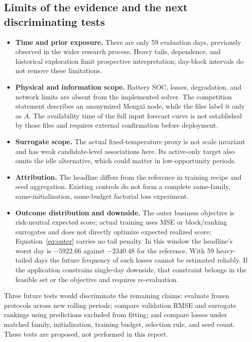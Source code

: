 \documentclass[11pt,a4paper]{article}
\begin{document}
\subsection{Limits of the evidence and the next discriminating tests}
\begin{itemize}
\item \textbf{Time and prior exposure.} There are only 59 evaluation days, previously observed in the wider research process. Heavy tails, dependence, and historical exploration limit prospective interpretation; day-block intervals do not remove these limitations.
\item \textbf{Physical and information scope.} Battery SOC, losses, degradation, and network limits are absent from the implemented solver. The competition statement describes an anonymized Mengxi node, while the files label it only as $A$. The availability time of the full input forecast curve is not established by those files and requires external confirmation before deployment.
\item \textbf{Surrogate scope.} The actual fixed-temperature proxy is not scale invariant and has weak candidate-level associations here. Its active-only target also omits the idle alternative, which could matter in low-opportunity periods.
\item \textbf{Attribution.} The headline differs from the reference in training recipe and seed aggregation. Existing controls do not form a complete same-family, same-initialization, same-budget factorial loss experiment.
\item \textbf{Outcome distribution and downside.} The outer business objective is risk-neutral expected score; actual training uses MSE or block/ranking surrogates and does not directly optimize expected realized score; Equation~\eqref{eq:outer} carries no tail penalty. In this window the headline's worst day is $-5922.66$ against $-2340.48$ for the reference. With 59 heavy-tailed days the future frequency of such losses cannot be estimated reliably. If the application constrains single-day downside, that constraint belongs in the feasible set or the objective and requires re-evaluation.
\end{itemize}
Three future tests would discriminate the remaining claims: evaluate frozen protocols across new rolling periods; compare validation RMSE and surrogate rankings using predictions excluded from fitting; and compare losses under matched family, initialization, training budget, selection rule, and seed count. These tests are proposed, not performed in this report.
\end{document}
